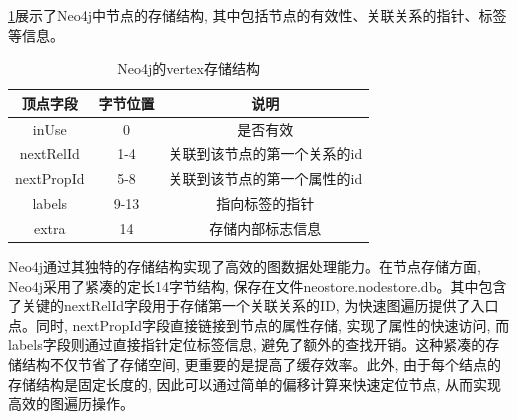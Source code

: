 \cref{tab:neo4j-vertex}展示了Neo4j中节点的存储结构, 其中包括节点的有效性、关联关系的指针、标签等信息。\begin{table}[H]
	\centering
	\caption{Neo4j的vertex存储结构}
	\begin{tabular}{|c|c|c|}
		\hline
		顶点字段       & 字节位置 & 说明              \\
		\hline
		inUse      & 0    & 是否有效            \\
		nextRelId   & 1-4  & 关联到该节点的第一个关系的id \\
		nextPropId & 5-8  & 关联到该节点的第一个属性的id \\
		labels     & 9-13 & 指向标签的指针         \\
		extra      & 14   & 存储内部标志信息        \\
		\hline
	\end{tabular}
	\label{tab:neo4j-vertex}
\end{table}
Neo4j通过其独特的存储结构实现了高效的图数据处理能力。在节点存储方面, Neo4j采用了紧凑的定长14字节结构, 保存在文件neostore.nodestore.db。其中包含了关键的nextRelId字段用于存储第一个关联关系的ID, 为快速图遍历提供了入口点。同时, nextPropId字段直接链接到节点的属性存储, 实现了属性的快速访问, 而labels字段则通过直接指针定位标签信息, 避免了额外的查找开销。这种紧凑的存储结构不仅节省了存储空间, 更重要的是提高了缓存效率。此外, 由于每个结点的存储结构是固定长度的, 因此可以通过简单的偏移计算来快速定位节点, 从而实现高效的图遍历操作。

